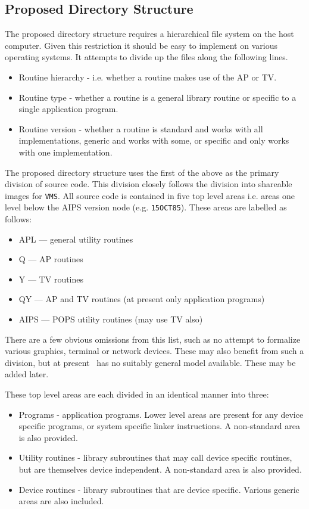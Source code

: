 \subsection{Proposed Directory Structure}

The proposed directory structure requires a hierarchical file system on
the host computer. Given this restriction it should be easy to implement
on various operating systems.  It attempts to divide up the files along
the following lines.

\begin{itemize}
  \item{Routine hierarchy - i.e. whether a routine makes use of the AP or TV.}
  \item{Routine type - whether a routine is a general library routine or
	specific to a single application program.}
  \item{Routine version - whether a routine is standard and works with all
	implementations, generic and works with some, or specific and
	only works with one implementation.}
\end{itemize}

The proposed directory structure uses the first of the above as the
primary division of source code. This division closely follows the
division into shareable images for {\tt VMS\/}. All source code is
contained in five top level areas i.e. areas one level below the AIPS
version node (e.g. {\tt 15OCT85}).  These areas are labelled as follows:

\begin{itemize}
  \item{APL --- general utility routines}
  \item{Q --- AP routines}
  \item{Y --- TV routines}
  \item{QY --- AP and TV routines (at present only application programs)}
  \item{AIPS --- POPS utility routines (may use TV also)}
\end{itemize}

There are a few obvious omissions from this list, such as no attempt to
formalize various graphics, terminal or network devices. These may also
benefit from such a division, but at present \AIPS\ has no suitably
general model available. These may be added later.

These top level areas are each divided in an identical manner into three:

\begin{itemize}
  \item{Programs - application programs. Lower level areas are present for
	any device specific programs, or system specific linker instructions.
	A non-standard area is also provided.}
  \item{Utility routines - library subroutines that may call device specific
	routines, but are themselves device independent. A non-standard
	area is also provided.}
  \item{Device routines - library subroutines that are device specific.
	Various generic areas are also included.}
\end{itemize}


